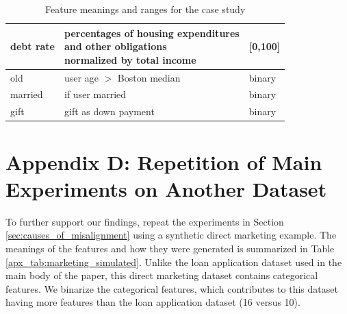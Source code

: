 \documentclass[mnsc,blindrev]{informs3}
\begin{document}
\begin{table}[ht!]
\begin{tabular}{l|l|l}
            debt rate           & \makecell[l]{percentages of housing expenditures \\ and other obligations \\ normalized by total income}    & {[}0,100{]}                   \\ \hline
            old              & user age $>$ Boston median & binary                        \\ \hline
            married          & if user married               & binary                        \\ \hline
            gift             & gift as down payment               & binary                         \\
            \bottomrule
            \end{tabular}
            \caption{Feature meanings and ranges for the case study}
            \label{apx_tab:case_study_features}
        \end{table}


  

    
    
    \section*{Appendix D: Repetition of Main Experiments on Another Dataset}
        \label{apx_sec:marketing}
        To further support our findings, repeat the experiments in Section \ref{sec:causes_of_misalignment} using a synthetic direct marketing example. The meanings of the features and how they were generated is summarized in Table \ref{apx_tab:marketing_simulated}. Unlike the loan application dataset used in the main body of the paper, this direct marketing dataset contains categorical features. We binarize the categorical features, which contributes to this dataset having more features than the loan application dataset (16 versus 10). 
\end{document}
